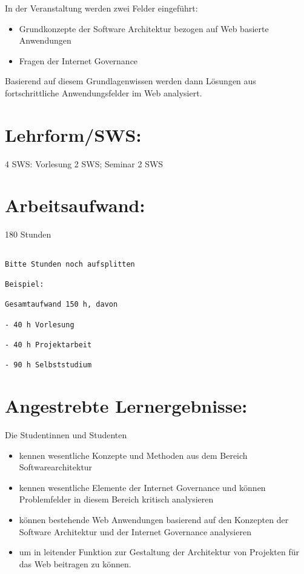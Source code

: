 In der Veranstaltung werden zwei Felder eingeführt:

\begin{itemize}
\item
  Grundkonzepte der Software Architektur bezogen auf Web basierte
  Anwendungen
\item
  Fragen der Internet Governance
\end{itemize}

Basierend auf diesem Grundlagenwissen werden dann Lösungen aus
fortschrittliche Anwendungsfelder im Web analysiert.

\section*{Lehrform/SWS:}\label{lehrformsws-22}

4 SWS: Vorlesung 2 SWS; Seminar 2 SWS

\section*{Arbeitsaufwand:}\label{arbeitsaufwand-28}

180 Stunden

\begin{verbatim}

Bitte Stunden noch aufsplitten

Beispiel:

Gesamtaufwand 150 h, davon 

- 40 h Vorlesung 

- 40 h Projektarbeit  

- 90 h Selbststudium 
\end{verbatim}

\section*{Angestrebte
Lernergebnisse:}\label{angestrebte-lernergebnisse-22}

Die Studentinnen und Studenten

\begin{itemize}
\item
  kennen wesentliche Konzepte und Methoden aus dem Bereich
  Softwarearchitektur
\item
  kennen wesentliche Elemente der Internet Governance und können
  Problemfelder in diesem Bereich kritisch analysieren
\item
  können bestehende Web Anwendungen basierend auf den Konzepten der
  Software Architektur und der Internet Governance analysieren
\item
  um in leitender Funktion zur Gestaltung der Architektur von Projekten
  für das Web beitragen zu können.
\end{itemize}


